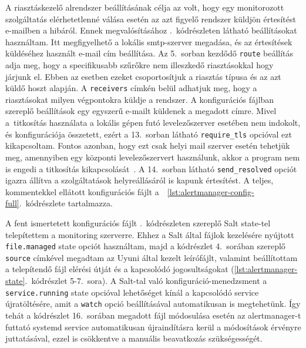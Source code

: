 A riasztáskezelő alrendszer beállításának célja az volt, hogy egy monitorozott szolgáltatás elérhetetlenné válása esetén az azt figyelő rendszer küldjön értesítést e-mailben a hibáról. Ennek megvalósításához .~kódrészleten látható beállításokat használtam. Itt megfigyelhető a lokális \acrshort{smtp}-szerver megadása, és az értesítések küldéséhez használt e-mail cím beállítása.
Az 5.~sorban kezdődő \texttt{route} beállítás adja meg, hogy a specifikusabb szűrőkre nem illeszkedő riasztásokkal hogy járjunk el. Ebben az esetben ezeket csoportosítjuk a riasztás típusa és az azt küldő hoszt alapján. A \texttt{receivers} címkén belül adhatjuk meg, hogy a riasztásokat milyen végpontokra küldje a rendszer. A konfigurációs fájlban szereplő beállítások egy egyszerű e-mailt küldenek a megadott címre. Mivel a~titkosítás használata a lokális gépen futó levelezőszerver esetében nem indokolt, és konfigurációja összetett, ezért a 13.~sorban látható \texttt{require\_tls} opcióval ezt kikapcsoltam. Fontos azonban, hogy ezt csak helyi mail szerver esetén tehetjük meg, amennyiben egy központi levelezőszervert használunk, akkor a program nem is engedi a titkosítás kikapcsolását~\cite{PrometheusAlertmanagerConfig}.
A 14.~sorban látható \texttt{send\_resolved} opciót igazra állítva a szolgáltatások helyreállásáról is kapunk értesítést. %
A teljes, kommentekkel ellátott konfigurációs fájlt a~~\ref{lst:alertmanager-config-full}.~kódrészlete tartalmazza.


\begin{figure}[htb]
	
\end{figure}

A fent ismertetett konfigurációs fájlt .~kódrészleten szereplő Salt state-tel telepítettem a monitoring szerverre. Ehhez a Salt által fájlok kezelésére nyújtott \texttt{file.managed} state opciót használtam, majd a kódrészlet 4.~sorában szereplő \texttt{source} címkével megadtam az Uyuni által kezelt leírófájlt, valamint beállítottam a telepítendő fájl elérési útját és a kapcsolódó jogosultságokat (\ref{lst:alertmanager-state}.~kódrészlet 5-7.~sora). 
A Salt-tal való konfiguráció-menedzsment a \texttt{service.running} state opcióval lehetőséget kínál a kapcsolódó service újratöltésére, amit a \texttt{watch} opció beállításával automatikusan is megtehetünk. Így tehát a kódrészlet 16.~sorában megadott fájl módosulása esetén az alertmanager-t futtató systemd service automatikusan újraindításra kerül a módosítások érvényre juttatásával, ezzel is csökkentve a manuális beavatkozás szükségességét.

